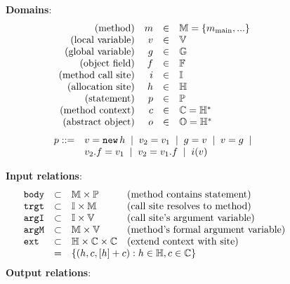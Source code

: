
\begin{figure*}
\begin{minipage}{3.3in}
{\bf Domains}: \\
\[
\begin{array}{rrcl}
\mbox{{(method)}}                  & m   &\in & {\mathbb M} = \{ m_\text{main}, ... \}\\
\mbox{{(local variable)}}          & v   &\in & {\mathbb V} \\
\mbox{{(global variable)}}         & g   &\in & {\mathbb G}  \\
\mbox{{(object field)}}            & f   &\in & {\mathbb F}  \\
\mbox{{(method call site)}}        & i   &\in & {\mathbb I} \\
\mbox{{(allocation site)}}         & h   &\in & {\mathbb H} \\
\mbox{{(statement)}}               & p   &\in & {\mathbb P} \\
\mbox{{(method context)}}          & c   &\in& {\mathbb C} = {\mathbb H}^* \\
\mbox{{(abstract object)}}         & o   &\in& {\mathbb O} = {\mathbb H}^* \\
\end{array}
\]
\[
\begin{array}{ll}
p ::= & v = \text{\tt new}\,h \;\mid\; v_2 = v_1 \;\mid\; g = v \;\mid\; v = g \;\mid\; \\
      & v_2.f = v_1 \;\mid\; v_2 = v_1.f  \;\mid\; i(v)
\end{array}
\]
\end{minipage}
\begin{minipage}{3.7in}
{\bf Input relations}: \\
\[ \begin{array}{lcll}
\body     &\subset& \M \times \P & \text{(method contains statement)} \\
\trgt     &\subset& \I \times \M & \text{(call site resolves to method)} \\
\argI     &\subset& \I \times \V & \text{(call site's argument variable)} \\
\argM     &\subset& \M \times \V & \text{(method's formal argument variable)} \\
\ext      &\subset& \H \times \C \times \C & \text{(extend context with site)} \\
          & =     & \multicolumn{2}{l}{\{ (h, c, [h]+c) : h\in\H, c\in\C \}} \\
\end{array}
\]
{\bf Output relations}: \\

\end{minipage}
\end{figure*}
